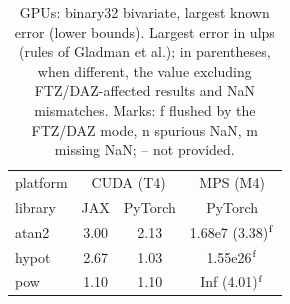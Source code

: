 \begin{table}
\centering
\begin{small}
\begin{tabular}{|l|cc|c|}
\hline
platform & \multicolumn{2}{c|}{CUDA (T4)} & \multicolumn{1}{c|}{MPS (M4)} \\
library & JAX & PyTorch & PyTorch \\ \hline
atan2 & 3.00 & 2.13 & 1.68e7 (3.38)$^{\rm f}$ \\
hypot & 2.67 & 1.03 & 1.55e26$^{\rm f}$ \\
pow & 1.10 & 1.10 & Inf (4.01)$^{\rm f}$ \\
\hline
\end{tabular}
\end{small}
\caption{GPUs: binary32 bivariate, largest known error (lower bounds). Largest error in ulps (rules of Gladman et al.); in parentheses, when different, the value excluding FTZ/DAZ-affected results and NaN mismatches. Marks: f flushed by the FTZ/DAZ mode, n spurious NaN, m missing NaN; -- not provided.}
\label{tab:b32bigpu}
\end{table}
